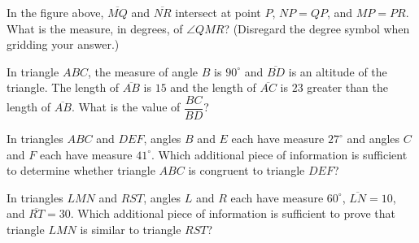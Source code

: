 In the figure above, $\overline{MQ}$ and $\overline{NR}$ intersect at point $P$, $NP = QP$, and $MP = PR$.  
What is the measure, in degrees, of $\angle QMR$? (Disregard the degree symbol when gridding your answer.)

\vspace{0.75em}

\vspace{2em}

\newpage
\noindent\markforreview
\vspace{1em}

In triangle $ABC$, the measure of angle $B$ is $90^\circ$ and $\overline{BD}$ is an altitude of the triangle.  
The length of $\overline{AB}$ is $15$ and the length of $\overline{AC}$ is $23$ greater than the length of $\overline{AB}$.  
What is the value of $\dfrac{BC}{BD}$?

\vspace{0.75em}


\vspace{2em}

\noindent\markforreview
\vspace{1em}

In triangles $ABC$ and $DEF$, angles $B$ and $E$ each have measure $27^\circ$ and angles $C$ and $F$ each have measure $41^\circ$.  
Which additional piece of information is sufficient to determine whether triangle $ABC$ is congruent to triangle $DEF$?

\vspace{0.75em}


\vspace{2em}
\newpage
\noindent\markforreview
\vspace{1em}

In triangles $LMN$ and $RST$, angles $L$ and $R$ each have measure $60^\circ$, $\overline{LN} = 10$, and $\overline{RT} = 30$.  
Which additional piece of information is sufficient to prove that triangle $LMN$ is similar to triangle $RST$?

\vspace{0.75em}


